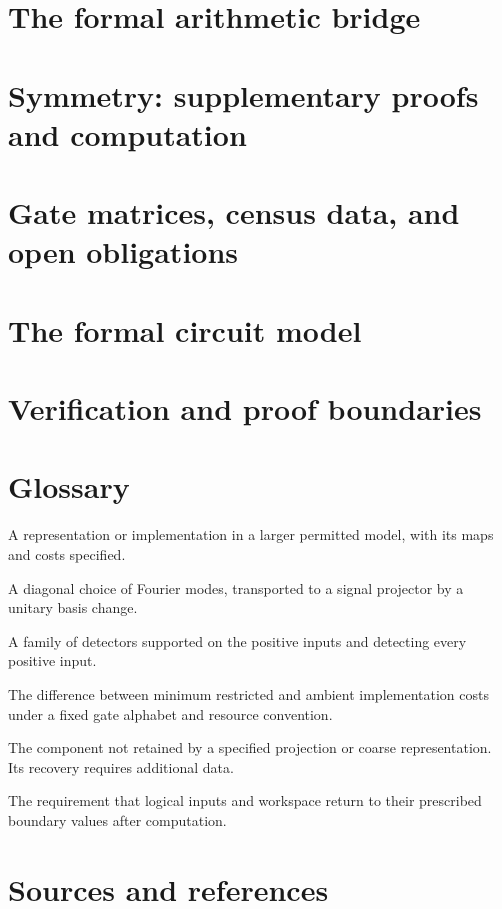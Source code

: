 \chapter{The formal arithmetic bridge}

\chapter{Symmetry: supplementary proofs and computation}
\begingroup\endgroup
\chapter{Gate matrices, census data, and open obligations}
\begingroup\endgroup
\chapter{The formal circuit model}
\begingroup\renewcommand{\F}{\mathbb F}\endgroup
\begingroup\endgroup
\chapter{Verification and proof boundaries}

\backmatter
\renewcommand{\VolumeRunningPart}{References}
\chapter{Glossary}
\begin{description}[style=nextline]
\item[Ambient realization] A representation or implementation in a larger permitted model, with its maps and costs specified.
\item[Arithmetic selector] A diagonal choice of Fourier modes, transported to a signal projector by a unitary basis change.
\item[Complete safe cover] A family of detectors supported on the positive inputs and detecting every positive input.
\item[Gate set defect] The difference between minimum restricted and ambient implementation costs under a fixed gate alphabet and resource convention.
\item[Residual] The component not retained by a specified projection or coarse representation. Its recovery requires additional data.
\item[Restoration] The requirement that logical inputs and workspace return to their prescribed boundary values after computation.
\end{description}
\begingroup\endgroup
\chapter{Sources and references}

\begingroup\endgroup

